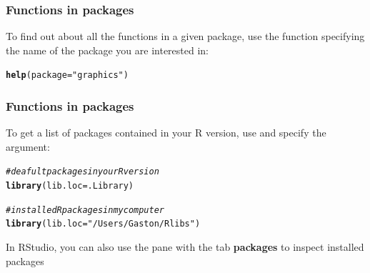 \documentclass[12pt]{beamer}\usepackage[]{graphicx}\usepackage[]{color}
\makeatletter
\newcommand{\hlstr}[1]{\textcolor[rgb]{0.192,0.494,0.8}{#1}}%
\newcommand{\hlcom}[1]{\textcolor[rgb]{0.678,0.584,0.686}{\textit{#1}}}%
\newcommand{\hlstd}[1]{\textcolor[rgb]{0.345,0.345,0.345}{#1}}%
\newcommand{\hlkwc}[1]{\textcolor[rgb]{0.333,0.667,0.333}{#1}}%
\newcommand{\hlkwd}[1]{\textcolor[rgb]{0.737,0.353,0.396}{\textbf{#1}}}%
\newenvironment{kframe}{%
 \def\at@end@of@kframe{}%
 \ifinner\ifhmode%
  \def\at@end@of@kframe{\end{minipage}}%
  \begin{minipage}{\columnwidth}%
 \fi\fi%
 \def\FrameCommand##1{\hskip\@totalleftmargin \hskip-\fboxsep
 \colorbox{shadecolor}{##1}\hskip-\fboxsep
     \hskip-\linewidth \hskip-\@totalleftmargin \hskip\columnwidth}%
 \MakeFramed {\advance\hsize-\width
   \@totalleftmargin\z@ \linewidth\hsize
   \@setminipage}}%
 {\par\unskip\endMakeFramed%
 \at@end@of@kframe}
\newenvironment{knitrout}{}{} %
\makeatother
\begin{document}

\begin{frame}[fragile]
\frametitle{Functions in packages}

To find out about all the functions in a given package, use the  function specifying the name of the package you are interested in:
\begin{knitrout}\footnotesize
{}\color{fgcolor}\begin{kframe}
\begin{alltt}
\hlkwd{help}\hlstd{(}\hlkwc{package} \hlstd{=} \hlstr{"graphics"}\hlstd{)}
\end{alltt}
\end{kframe}
\end{knitrout}

\end{frame}


\begin{frame}[fragile]
\frametitle{Functions in packages}

To get a list of packages contained in your R version, use  and specify the  argument:
\begin{knitrout}\footnotesize
{}\color{fgcolor}\begin{kframe}
\begin{alltt}
\hlcom{# deafult packages in your R version}
\hlkwd{library}\hlstd{(}\hlkwc{lib.loc} \hlstd{= .Library)}
\end{alltt}
\end{kframe}
\end{knitrout}

\begin{knitrout}\footnotesize
{}\color{fgcolor}\begin{kframe}
\begin{alltt}
\hlcom{# installed R packages in my computer}
\hlkwd{library}\hlstd{(}\hlkwc{lib.loc} \hlstd{=} \hlstr{"/Users/Gaston/Rlibs"}\hlstd{)}
\end{alltt}
\end{kframe}
\end{knitrout}

In RStudio, you can also use the pane with the tab \textbf{packages} to inspect installed packages 

\end{frame}
\end{document}
